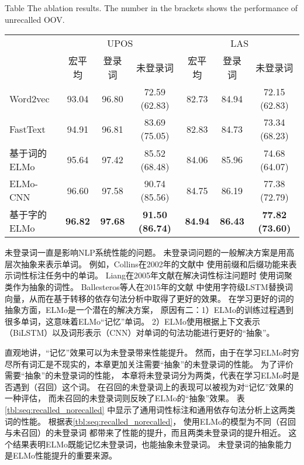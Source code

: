 \begin{table}[t]
	{Table $\!$}{The ablation results. The number in the brackets shows the performance  of unrecalled OOV.\label{tbl:seq:ablation}}
	\vspace{0.5em}\centering\wuhao
	\begin{tabular}{l | ccc| ccc}
		\toprule[1.5pt]
		& \multicolumn{3}{c|}{UPOS} &  \multicolumn{3}{c}{LAS}\\
		& 宏平均 & 登录词 & 未登录词 & 宏平均 & 登录词 & 未登录词 \\
		\midrule[1pt]
		Word2vec & 93.04 & 96.80 & 72.59 (62.83) & 82.73 & 84.94 & 72.15 (62.83) \\
		FastText & 94.91 & 96.81 & 83.69 (75.05) & 82.83 & 84.73 & 73.34 (68.23) \\
		基于词的ELMo & 95.64 & 97.42 & 85.52 (68.48) & 84.06 & 85.96 & 74.68 (64.07) \\
		ELMo-CNN & 96.60 & 97.58 & 90.74 (85.56) & 84.75 & 86.19 & 77.38 (72.79)\\
		基于字的ELMo & \bf 96.82 & \bf 97.68 & \bf 91.50 (86.74) & \bf 84.94 & \bf 86.43 & \bf 77.82 (73.60)\\
		\bottomrule[1.5pt]
	\end{tabular}
\end{table}

未登录词一直是影响NLP系统性能的问题。
未登录词问题的一般解决方案是用高层次抽象来表示单词。
例如，Collins在2002年的文献中
使用前缀和后缀功能来表示词性标注任务中的单词。 
Liang在2005年文献在解决词性标注问题时
使用词聚类作为抽象的词性。
Ballesteros等人在2015年的文献
中使用字符级LSTM替换词向量，从而在基于转移的依存句法分析中取得了更好的效果。
在学习更好的词的抽象方面，ELMo是一个潜在的解决方案，
原因有二：1）ELMo的训练过程遇到很多单词，这意味着ELMo``记忆''单词。
2）ELMo使用根据上下文表示（BiLSTM）以及词形表示（CNN）对单词的句法功能进行更好的``抽象''。

直观地讲，``记忆''效果可以为未登录带来性能提升。
然而，由于在学习ELMo时穷尽所有词汇是不现实的，本章更加关注需要``抽象''的未登录词的性能。
为了评价需要``抽象''的未登录词的性能，
本章将未登录词分为两类，代表在学习ELMo时是否遇到（召回）这个词。
在召回的未登录词上的表现可以被视为对``记忆''效果的一种评估，
而未召回的未登录词则反映了ELMo的``抽象''效果。
表\ref{tbl:seq:recalled_norecalled}
中显示了通用词性标注和通用依存句法分析上这两类词的性能。
根据表\ref{tbl:seq:recalled_norecalled}，
使用ELMo的模型为不同（召回与未召回）的未登录词
都带来了性能的提升，而且两类未登录词的提升相近。
这个结果表明ELMo既能记忆未登录词，也能抽象未登录词。
未登录词的抽象能力是ELMo性能提升的重要来源。

